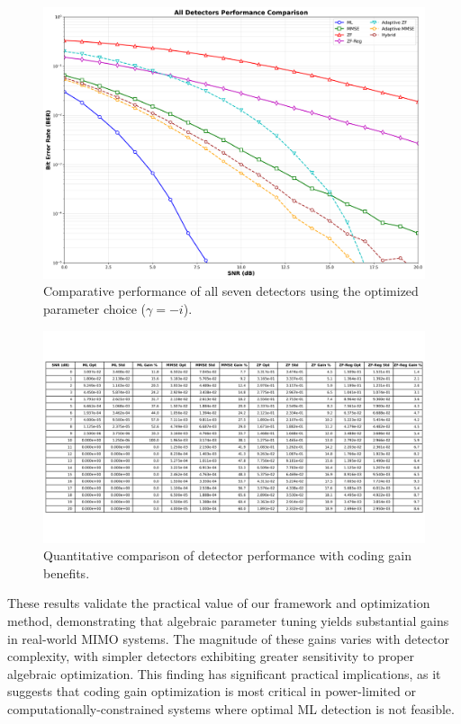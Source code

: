 \begin{figure}[!t]
\centering
\includegraphics[width=0.9\columnwidth]{figures/all_detectors_comparison.png} 
\caption{Comparative performance of all seven detectors using the optimized parameter choice (\(\gamma = -i\)).}
\label{fig:all_detectors}
\end{figure}

\begin{figure}[!t]
\centering
\includegraphics[width=0.95\columnwidth]{figures/performance_table.png} 
\caption{Quantitative comparison of detector performance with coding gain benefits.}
\label{tab:performance}
\end{figure}

These results validate the practical value of our framework and optimization method, demonstrating that algebraic parameter tuning yields substantial gains in real-world MIMO systems. The magnitude of these gains varies with detector complexity, with simpler detectors exhibiting greater sensitivity to proper algebraic optimization. This finding has significant practical implications, as it suggests that coding gain optimization is most critical in power-limited or computationally-constrained systems where optimal ML detection is not feasible.
